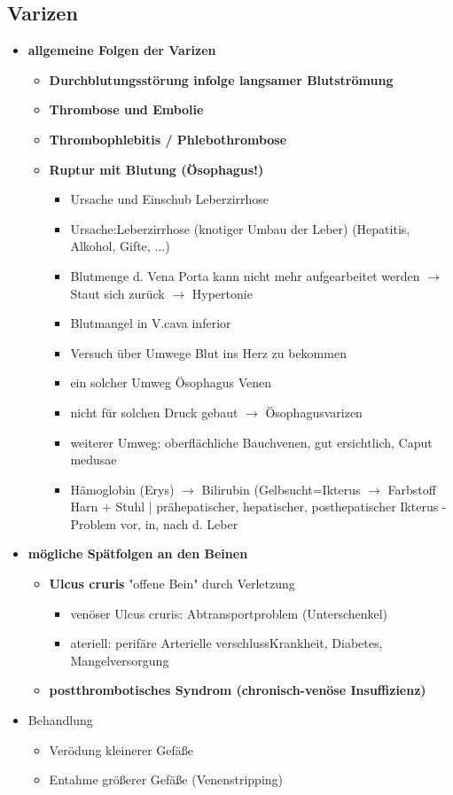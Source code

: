 	\subsection{Varizen}
		\begin{itemize}
			\item \textbf{allgemeine Folgen der Varizen}
				\begin{itemize}
					\item \textbf{Durchblutungsstörung infolge langsamer Blutströmung}
					\item \textbf{Thrombose und Embolie}
					\item \textbf{Thrombophlebitis / Phlebothrombose}
					\item \textbf{Ruptur mit Blutung (Ösophagus!)}
						\begin{itemize}
							\item Ursache und Einschub Leberzirrhose
							\item Ursache:Leberzirrhose (knotiger Umbau der Leber) (Hepatitis, Alkohol, Gifte, $\dots$)
							\item Blutmenge d. Vena Porta kann nicht mehr aufgearbeitet werden $\rightarrow$ Staut sich zurück $\rightarrow$ Hypertonie
							\item Blutmangel in V.cava inferior 
							\item Versuch über Umwege Blut ins Herz zu bekommen
							\item ein solcher Umweg Ösophagus Venen 
							\item nicht für solchen Druck gebaut $\rightarrow$ Ösophagusvarizen
							\item weiterer Umweg: oberflächliche Bauchvenen, gut ersichtlich, Caput medusae
							\item Hämoglobin (Erys) $\rightarrow$ Bilirubin (Gelbsucht=Ikterus $\rightarrow$ Farbstoff Harn + Stuhl | prähepatischer, hepatischer, posthepatischer Ikterus - Problem vor, in, nach d. Leber
						\end{itemize}
				\end{itemize}
	\pagebreak
			\item \textbf{mögliche Spätfolgen an den Beinen}
				\begin{itemize}
					\item \textbf{Ulcus cruris} "offene Bein" durch Verletzung
						\begin{itemize}
							\item venöser Ulcus cruris: Abtransportproblem (Unterschenkel)
							\item ateriell: perifäre Arterielle verschlussKrankheit, Diabetes, Mangelversorgung
						\end{itemize}
					\item \textbf{postthrombotisches Syndrom (chronisch-venöse Insuffizienz)}
				\end{itemize}
			\item Behandlung
				\begin{itemize}
					\item Verödung kleinerer Gefäße
					\item Entahme größerer Gefäße (Venenstripping)
				\end{itemize}
		\end{itemize}
